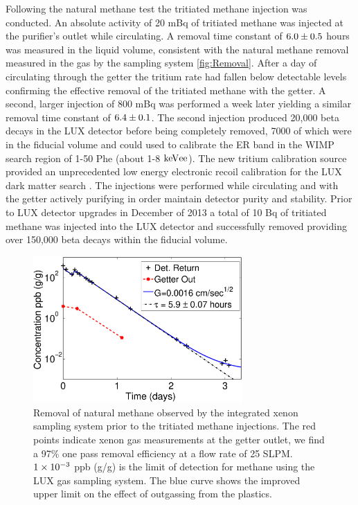 Following the natural methane test the tritiated methane injection was conducted. An absolute activity of 20 mBq of tritiated methane was injected at the purifier's outlet while circulating. A removal time constant of $\rm 6.0 \pm 0.5$ hours was measured in the liquid volume, consistent with the natural methane removal measured in the gas by the sampling system \ref{fig:Removal}. After a day of circulating through the getter the tritium rate had fallen below detectable levels confirming the effective removal of the tritiated methane with the getter. A second, larger injection of 800 mBq was performed a week later yielding a similar removal time constant of $\rm 6.4 \pm 0.1$. The second injection produced 20,000 beta decays in the LUX detector before being completely removed, 7000 of which were in the fiducial volume and could used to calibrate the ER band in the WIMP search region of 1-50 Phe (about 1-8 $\rm keV{ee}$). The new tritium calibration source provided an unprecedented low energy electronic recoil calibration for the LUX dark matter search \cite{LUX_PRL}. The injections were performed while circulating and with the getter actively purifying in order maintain detector purity and stability. Prior to LUX detector upgrades in December of 2013 a total of 10 Bq of tritiated methane was injected into the LUX detector and successfully removed providing over 150,000 beta decays within the fiducial volume. 


\begin{figure}[h!]\centering
\includegraphics[width=80mm]{July_CH4_wOG.eps}
\caption{Removal of natural methane observed by the integrated xenon sampling system prior to the tritiated methane injections. The red points indicate xenon gas measurements at the getter outlet, we find a 97\% one pass removal efficiency at a flow rate of 25 SLPM. $\rm 1\times10^{-3}$ ppb (g/g) is the limit of detection for methane using the LUX gas sampling system. The blue curve shows the improved upper limit on the effect of outgassing from the plastics. }
\label{fig:Removal_methane}
\end{figure}

